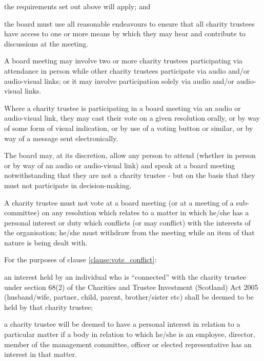 ﻿\documentclass[a4paper,11pt,onecolumn ]{article}
\begin{document}
\begin{legal}
\begin{legal}[label=\alph*)]
    \item the requirements set out above will apply; and 
    \item the board must use all reasonable endeavours to ensure that all charity trustees have access to one or more means by which they may hear and contribute to discussions at the meeting.
    \end{legal}
\item A board meeting may involve two or more charity trustees participating via attendance in person while other charity trustees participate via audio and/or audio-visual links; or it may involve participation solely via audio and/or audio-visual links.
\item Where a charity trustee is participating in a board meeting via an audio or audio-visual link, they may cast their vote on a given resolution orally, or by way of some form of visual indication, or by use of a voting button or similar, or by way of a message sent electronically. 
\item The board may, at its discretion, allow any person to attend (whether in person or by way of an audio or audio-visual link) and speak at a board meeting notwithstanding that they are not a charity trustee - but on the basis that they must not participate in decision-making.
\item \label{clause:vote_conflict} A charity trustee must not vote at a board meeting (or at a meeting of a sub-committee) on any resolution which relates to a matter in which he/she has a personal interest or duty which conflicts (or may conflict) with the interests of the organisation; he/she must withdraw from the meeting while an item of that nature is being dealt with.

\item For the purposes of clause \ref{clause:vote_conflict}:
    \begin{legal}
        \item an interest held by an individual who is “connected” with the charity trustee under section 68(2) of the Charities and Trustee Investment (Scotland) Act 2005 (husband/wife, partner, child, parent, brother/sister etc) shall be deemed to be held by that charity trustee;
        \item a charity trustee will be deemed to have a personal interest in relation to a particular matter if a body in relation to which he/she is an employee, director, member of the management committee, officer or elected representative has an interest in that matter.
    \end{legal}
\end{legal}
\end{document}
